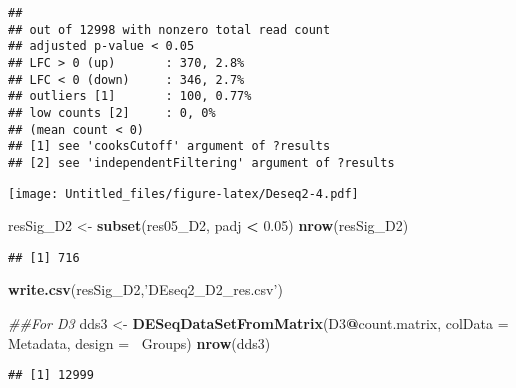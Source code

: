 \documentclass[]{article}
\newenvironment{Shaded}{\begin{snugshade}}{\end{snugshade}}
\newcommand{\CommentTok}[1]{\textcolor[rgb]{0.56,0.35,0.01}{\textit{#1}}}
\newcommand{\DataTypeTok}[1]{\textcolor[rgb]{0.13,0.29,0.53}{#1}}
\newcommand{\DecValTok}[1]{\textcolor[rgb]{0.00,0.00,0.81}{#1}}
\newcommand{\FloatTok}[1]{\textcolor[rgb]{0.00,0.00,0.81}{#1}}
\newcommand{\KeywordTok}[1]{\textcolor[rgb]{0.13,0.29,0.53}{\textbf{#1}}}
\newcommand{\NormalTok}[1]{#1}
\newcommand{\OperatorTok}[1]{\textcolor[rgb]{0.81,0.36,0.00}{\textbf{#1}}}
\newcommand{\StringTok}[1]{\textcolor[rgb]{0.31,0.60,0.02}{#1}}
\begin{document}
\begin{verbatim}
## 
## out of 12998 with nonzero total read count
## adjusted p-value < 0.05
## LFC > 0 (up)       : 370, 2.8%
## LFC < 0 (down)     : 346, 2.7%
## outliers [1]       : 100, 0.77%
## low counts [2]     : 0, 0%
## (mean count < 0)
## [1] see 'cooksCutoff' argument of ?results
## [2] see 'independentFiltering' argument of ?results
\end{verbatim}

\begin{Shaded}
\end{Shaded}

\texttt{[image: Untitled\_files/figure-latex/Deseq2-4.pdf]}

\begin{Shaded}
\begin{Highlighting}[]
\NormalTok{resSig_D2 <-}\StringTok{ }\KeywordTok{subset}\NormalTok{(res05_D2, padj }\OperatorTok{<}\StringTok{ }\FloatTok{0.05}\NormalTok{)}
\KeywordTok{nrow}\NormalTok{(resSig_D2)}
\end{Highlighting}
\end{Shaded}

\begin{verbatim}
## [1] 716
\end{verbatim}

\begin{Shaded}
\begin{Highlighting}[]
\KeywordTok{write.csv}\NormalTok{(resSig_D2,}\StringTok{'DEseq2_D2_res.csv'}\NormalTok{)}


\CommentTok{##For D3}
\NormalTok{dds3 <-}\StringTok{ }\KeywordTok{DESeqDataSetFromMatrix}\NormalTok{(D3}\OperatorTok{@}\NormalTok{count.matrix, }
                              \DataTypeTok{colData =}\NormalTok{ Metadata, }
                              \DataTypeTok{design =} \OperatorTok{~}\NormalTok{Groups)}
\KeywordTok{nrow}\NormalTok{(dds3) }
\end{Highlighting}
\end{Shaded}

\begin{verbatim}
## [1] 12999
\end{verbatim}
\end{document}
